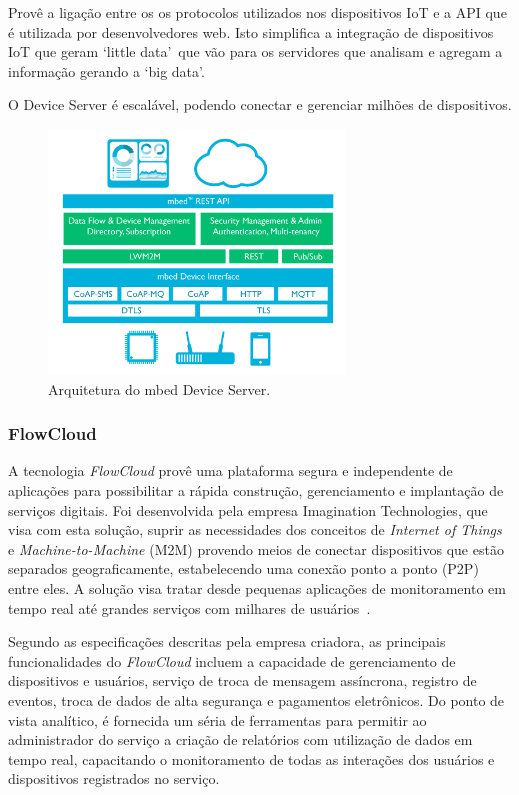 Provê a ligação entre os os protocolos utilizados nos dispositivos IoT e a API que é utilizada por
desenvolvedores web. Isto simplifica a integração de dispositivos IoT que geram \lq little data\rq\ que vão
para os servidores que analisam e agregam a informação gerando a \lq big data\rq.

O Device Server é escalável, podendo conectar e gerenciar milhões de dispositivos.
\begin{figure}[H]
	\centering
		\includegraphics[width=0.7\textwidth]{fig/mbed_arch.png}
	\caption{Arquitetura do mbed Device Server.}
\end{figure}

\subsubsection{FlowCloud}
A tecnologia \textit{FlowCloud} provê uma plataforma segura e independente de aplicações para possibilitar
a rápida construção, gerenciamento e implantação de serviços digitais. Foi desenvolvida pela empresa
Imagination Technologies, que visa com esta solução, suprir as necessidades dos conceitos de
\textit{Internet of Things} e \textit{Machine-to-Machine} (M2M) provendo meios de conectar dispositivos
que estão separados geograficamente, estabelecendo uma conexão ponto a ponto (P2P) entre eles.
A solução visa tratar desde pequenas aplicações de monitoramento em tempo real até grandes serviços
com milhares de usuários~\cite{flowcloud}.

Segundo as especificações descritas pela empresa criadora, as principais funcionalidades do \textit{FlowCloud}
incluem a capacidade de gerenciamento de dispositivos e usuários, serviço de troca de mensagem assíncrona,
registro de eventos, troca de dados de alta segurança e pagamentos eletrônicos. Do ponto de vista analítico,
é fornecida um séria de ferramentas para permitir ao administrador do serviço a criação de relatórios com
utilização de dados em tempo real, capacitando o monitoramento de todas as interações dos usuários e
dispositivos registrados no serviço.

